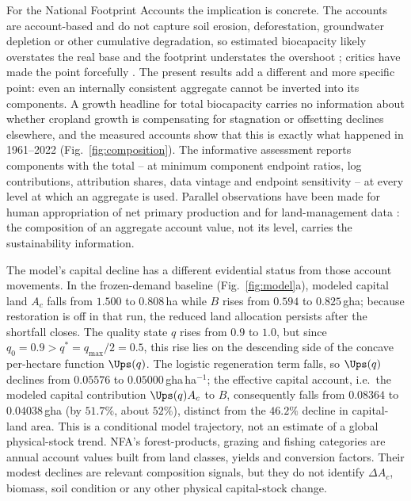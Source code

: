For the National Footprint Accounts the implication is concrete. The accounts are account-based and do not capture soil erosion, deforestation, groundwater depletion or other cumulative degradation, so estimated biocapacity likely overstates the real base and the footprint understates the overshoot \citep{Wackernagel2002,Borucke2013}; critics have made the point forcefully \citep{Blomqvist2013,GiampietroSaltelli2014,Galli2016,vdBerghGrazi2015}. The present results add a different and more specific point: even an internally consistent aggregate cannot be inverted into its components. A growth headline for total biocapacity carries no information about whether cropland growth is compensating for stagnation or offsetting declines elsewhere, and the measured accounts show that this is exactly what happened in 1961--2022 (Fig.~\ref{fig:composition}). The informative assessment reports components with the total -- at minimum component endpoint ratios, log contributions, attribution shares, data vintage and endpoint sensitivity -- at every level at which an aggregate is used. Parallel observations have been made for human appropriation of net primary production and for land-management data \citep{Haberl2007,Krausmann2013,Erb2017,Carvalhais2014}: the composition of an aggregate account value, not its level, carries the sustainability information.

The model's capital decline has a different evidential status from those account movements. In the frozen-demand baseline (Fig.~\ref{fig:model}a), modeled capital land $A_c$ falls from $1.500$ to $0.808$\,ha while $B$ rises from $0.594$ to $0.825$\,gha; because restoration is off in that run, the reduced land allocation persists after the shortfall closes. The quality state $q$ rises from $0.9$ to $1.0$, but since $q_0=0.9>q^*=q_{\max}/2=0.5$, this rise lies on the descending side of the concave per-hectare function $\Ups(q)$. The logistic regeneration term falls, so $\Ups(q)$ declines from $0.05576$ to $0.05000$\,gha\,ha$^{-1}$; the effective capital account, i.e.\ the modeled capital contribution $\Ups(q)A_c$ to $B$, consequently falls from $0.08364$ to $0.04038$\,gha (by $51.7\%$, about $52\%$), distinct from the $46.2\%$ decline in capital-land area. This is a conditional model trajectory, not an estimate of a global physical-stock trend. NFA's forest-products, grazing and fishing categories are annual account values built from land classes, yields and conversion factors. Their modest declines are relevant composition signals, but they do not identify $\Delta A_c$, biomass, soil condition or any other physical capital-stock change.

